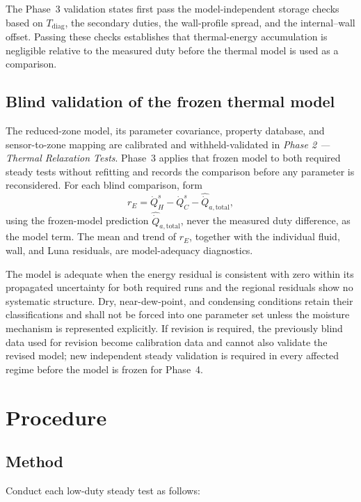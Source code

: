 \documentclass[11pt]{article}
\newcommand{\Tdiag}{T_{\mathrm{diag}}}
\newcommand{\QHs}{\dot Q_{H}^{s}}
\newcommand{\QCs}{\dot Q_{C}^{s}}
\newcommand{\PhaseTwoDoc}{\textit{Phase 2 --- Thermal Relaxation Tests}}
\begin{document}
The Phase~3 validation states first pass the model-independent storage checks based on $\Tdiag$, the secondary duties, the wall-profile spread, and the internal--wall offset. Passing these checks establishes that thermal-energy accumulation is negligible relative to the measured duty before the thermal model is used as a comparison.

\subsection{Blind validation of the frozen thermal model}
The reduced-zone model, its parameter covariance, property database, and sensor-to-zone mapping are calibrated and withheld-validated in \PhaseTwoDoc. Phase~3 applies that frozen model to both required steady tests without refitting and records the comparison before any parameter is reconsidered. For each blind comparison, form
\begin{equation}
    r_E
    =
    \QHs-\QCs-\widehat{\dot Q}_{a,\mathrm{total}},
    \label{eq:energy_residual}
\end{equation}
using the frozen-model prediction $\widehat{\dot Q}_{a,\mathrm{total}}$, never the measured duty difference, as the model term. The mean and trend of $r_E$, together with the individual fluid, wall, and Luna residuals, are model-adequacy diagnostics.

The model is adequate when the energy residual is consistent with zero within its propagated uncertainty for both required runs and the regional residuals show no systematic structure. Dry, near-dew-point, and condensing conditions retain their classifications and shall not be forced into one parameter set unless the moisture mechanism is represented explicitly. If revision is required, the previously blind data used for revision become calibration data and cannot also validate the revised model; new independent steady validation is required in every affected regime before the model is frozen for Phase~4.

\clearpage
\section{Procedure}
\label{sec:procedure}
\label{sec:test_procedure}
\label{sec:low_duty}
\subsection{Method}

Conduct each low-duty steady test as follows:
\end{document}
